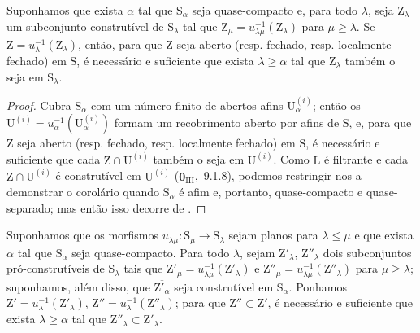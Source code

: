 \begin{corollary}[8.3.12]
\label{IV.8.3.12}
Suponhamos que exista $\alpha$ tal que $\mathrm{S}_\alpha$ seja quase-compacto e, para todo $\lambda$, seja $\mathrm{Z}_\lambda$ um subconjunto construtível de $\mathrm{S}_\lambda$ tal que $\mathrm{Z}_\mu=u_{\lambda\mu}^{-1}(\mathrm{Z}_\lambda)$ para $\mu\geqslant\lambda$.
Se $\mathrm{Z}=u_\lambda^{-1}(\mathrm{Z}_\lambda)$,
então, para que $\mathrm{Z}$ seja aberto (resp. fechado, resp. localmente fechado) em $\mathrm{S}$, é necessário e suficiente que exista $\lambda\geqslant\alpha$ tal que $\mathrm{Z}_\lambda$ também o seja em $\mathrm{S}_\lambda$.
\end{corollary}

\begin{proof}
Cubra $\mathrm{S}_\alpha$ com um número finito de abertos afins $\mathrm{U}_\alpha^{(i)}$; então os $\mathrm{U}^{(i)}=u_\alpha^{-1}(\mathrm{U}_\alpha^{(i)})$ formam um recobrimento aberto por afins de $\mathrm{S}$, e, para que $\mathrm{Z}$ seja aberto (resp. fechado, resp. localmente fechado) em $\mathrm{S}$, é necessário e suficiente que cada $\mathrm{Z}\cap\mathrm{U}^{(i)}$ também o seja em $\mathrm{U}^{(i)}$.
Como $\mathrm{L}$ é filtrante e cada $\mathrm{Z}\cap\mathrm{U}^{(i)}$ é construtível em $\mathrm{U}^{(i)}$ ($\mathbf{0}_{\mathrm{III}}$,~9.1.8), podemos restringir-nos a demonstrar o corolário quando $\mathrm{S}_\alpha$ é afim e, portanto, quase-compacto e quase-separado; mas então isso decorre de .
\end{proof}

\begin{proposition}[8.3.13]
\label{IV.8.3.13}
Suponhamos que os morfismos $u_{\lambda\mu}:\mathrm{S}_\mu\to\mathrm{S}_\lambda$ sejam planos para $\lambda\leqslant\mu$ e que exista $\alpha$ tal que $\mathrm{S}_\alpha$ seja quase-compacto.
Para todo $\lambda$, sejam $\mathrm{Z}'_\lambda$, $\mathrm{Z}''_\lambda$ dois subconjuntos pró-construtíveis de $\mathrm{S}_\lambda$ tais que $\mathrm{Z}'_\mu=u_{\lambda\mu}^{-1}(\mathrm{Z}'_\lambda)$ e $\mathrm{Z}''_\mu=u_{\lambda\mu}^{-1}(\mathrm{Z}''_\lambda)$ para $\mu\geqslant\lambda$; suponhamos, além disso, que $\overline{\mathrm{Z}'_\alpha}$ seja construtível em $\mathrm{S}_\alpha$.
Ponhamos $\mathrm{Z}'=u_\lambda^{-1}(\mathrm{Z}'_\lambda)$, $\mathrm{Z}''=u_\lambda^{-1}(\mathrm{Z}''_\lambda)$; para que $\mathrm{Z}''\subset\overline{\mathrm{Z}'}$, é necessário e suficiente que exista $\lambda\geqslant\alpha$ tal que $\mathrm{Z}''_\lambda\subset\overline{\mathrm{Z}'_\lambda}$.
\end{proposition}

